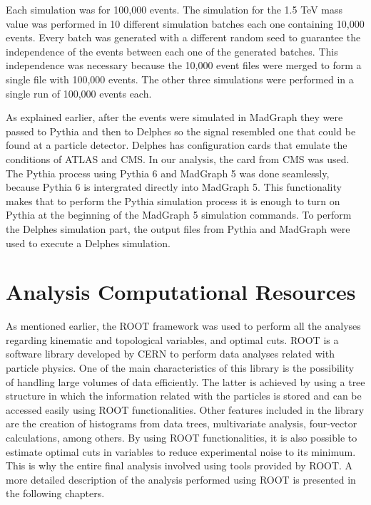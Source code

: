 Each simulation was for 100,000 events. The simulation for the 1.5 TeV mass value was performed in 10 different simulation batches each one containing 10,000 events. Every batch was generated with a different random seed to guarantee the independence of the events between each one of the generated batches. This independence was necessary because the 10,000 event files were merged to form a single file with 100,000 events. The other three simulations were performed in a single run of 100,000 events each.

As explained earlier, after the events were simulated in MadGraph they were passed to Pythia and then to Delphes so the signal resembled one that could be found at a particle detector. Delphes has configuration cards that emulate the conditions of ATLAS and CMS. In our analysis, the card from CMS was used. The Pythia process using Pythia 6 and MadGraph 5 was done seamlessly, because Pythia 6 is intergrated directly into MadGraph 5. This functionality makes that to perform the Pythia simulation process it is enough to turn on Pythia at the beginning of the MadGraph 5 simulation commands. To perform the Delphes simulation part, the output files from Pythia and MadGraph were used to execute a Delphes simulation.

\section{Analysis Computational Resources}

As mentioned earlier, the ROOT framework was used to perform all the analyses regarding kinematic and topological variables, and optimal cuts. ROOT is a software library developed by CERN to perform data analyses related with particle physics. One of the main characteristics of this library is the possibility of handling large volumes of data efficiently. The latter is achieved by using a tree structure in which the information related with the particles is stored and can be accessed easily using ROOT functionalities. Other features included in the library are the creation of histograms from data trees, multivariate analysis, four-vector calculations, among others. By using ROOT functionalities, it is also possible to estimate optimal cuts in variables to reduce experimental noise to its minimum. This is why the entire final analysis involved using tools provided by ROOT. A more detailed description of the analysis performed using ROOT is presented in the following chapters.

